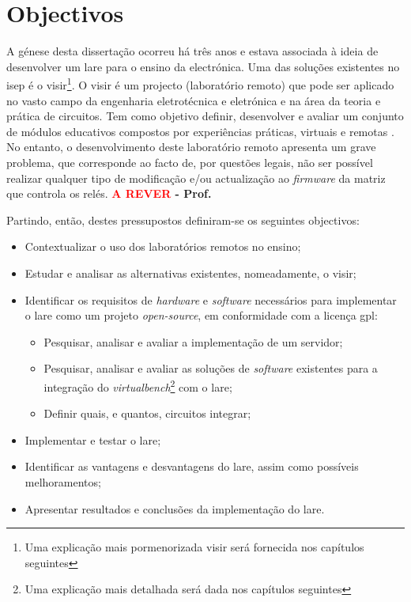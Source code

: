 \section{Objectivos}
\label{sec:Objectivos}
A génese desta dissertação ocorreu há três anos e estava associada à ideia de desenvolver um \acrfull{lare} para o ensino da electrónica. Uma das soluções existentes no \acrfull{isep} é o \acrfull{visir}\footnote{Uma explicação mais pormenorizada \acrshort{visir} será fornecida nos capítulos seguintes}.
O \acrshort{visir} é um projecto (\acrshort{laboratório remoto}) que pode ser aplicado no vasto campo da engenharia eletrotécnica e eletrónica e na área da teoria e prática de circuitos. Tem como objetivo definir, desenvolver e avaliar um conjunto de módulos educativos compostos por experiências práticas, virtuais e remotas \cite{visirisep}.
No entanto, o desenvolvimento deste \acrshort{laboratório remoto} apresenta um grave problema, que corresponde ao facto de, por questões legais, não ser possível realizar qualquer tipo de modificação e/ou actualização ao \textit{firmware} da matriz que controla os relés. \textbf{\textcolor{red}{A REVER} - Prof.}

Partindo, então, destes pressupostos definiram-se os seguintes objectivos:
\begin{itemize}
    \item Contextualizar o uso dos laboratórios remotos no ensino;
    \item Estudar e analisar as alternativas existentes, nomeadamente, o \acrshort{visir};
    \item Identificar os requisitos de \textit{hardware} e \textit{software} necessários para implementar o \acrshort{lare} como um projeto \textit{open-source}, em conformidade com a licença \acrfull{gpl}:
    \begin{itemize}
        \item Pesquisar, analisar e avaliar a implementação de um servidor;
        \item Pesquisar, analisar e avaliar as soluções de \textit{software} existentes para a integração do \textit{\acrfull{virtualbench}}\footnote{Uma explicação mais detalhada será dada nos capítulos seguintes} com o \acrshort{lare};
         \item Definir quais, e quantos, circuitos integrar;
    \end{itemize}
    \item Implementar e testar o \acrshort{lare};
    \item Identificar as vantagens e desvantagens do \acrshort{lare}, assim como possíveis melhoramentos;
    \item Apresentar resultados e conclusões da implementação do \acrshort{lare}.
\end{itemize}

